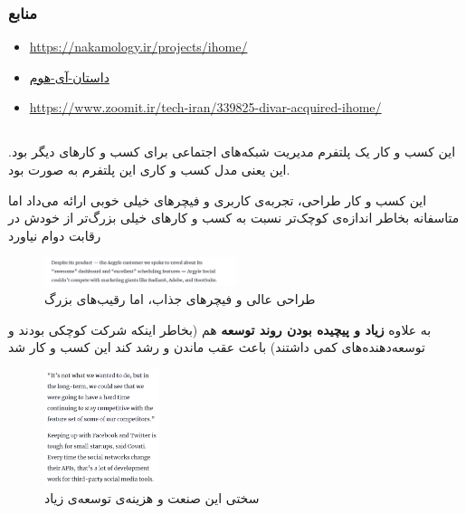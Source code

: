 \documentclass[dvipsnames, svgnames, x11names, 11pt, twocolumn]{article}
\begin{document}
\subsubsection{منابع}
\begin{itemize}
\item 
\url{https://nakamology.ir/projects/ihome/}

\item 
\href{https://virgool.io/product-management/%D8%AF%D8%A7%D8%B3%D8%AA%D8%A7%D9%86-%D8%A2%DB%8C-%D9%87%D9%88%D9%85-%D8%B4%D8%B1%D9%88%D8%B9-%D9%85%D9%88%D9%81%D9%82%DB%8C%D8%AA-%D9%88-%D8%B4%DA%A9%D8%B3%D8%AA-aoxc2pqljwbu}{\lr{\texttt{https://virgool.io/product-management/}}داستان-آی-هوم}

\item 
\url{https://www.zoomit.ir/tech-iran/339825-divar-acquired-ihome/}
\end{itemize}

\subsection{}
این کسب و کار یک پلتفرم مدیریت شبکه‌های اجتماعی برای کسب و کار‌های دیگر بود. این یعنی مدل کسب و کاری این پلتفرم به صورت
بود.

این کسب و کار طراحی، تجربه‌ی کاربری و فیچر‌های خیلی خوبی ارائه می‌داد اما متاسفانه بخاطر اندازه‌ی کوچک‌تر نسبت به کسب و کار‌های خیلی بزرگ‌تر از خودش در رقابت دوام نیاورد

\begin{figure}[H]
\begin{center}
\includegraphics[width=0.5\textwidth, height=0.05\textheight]{images/argyle-ui}
\caption{طراحی عالی و فیچر‌های جذاب، اما رقیب‌های بزرگ}
\end{center}
\end{figure}

به علاوه \textbf{زیاد و پیچیده بودن روند توسعه} هم (بخاطر اینکه شرکت کوچکی بودند و توسعه‌دهنده‌های کمی داشتند) باعث عقب ماندن و رشد کند این کسب و کار شد

\begin{figure}[H]
\begin{center}
\includegraphics[width=0.3\textwidth, height=0.25\textheight]{images/argyle-twitter}
\caption{سختی این صنعت و هزینه‌ی توسعه‌ی زیاد}
\end{center}
\end{figure}
\end{document}
